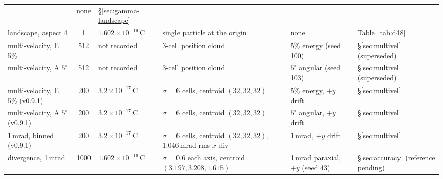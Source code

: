 \begin{table}[t]
\begin{longtable}{@{}p{2.3cm}cp{2.5cm}p{2.9cm}p{2.9cm}p{2.9cm}@{}}
  & none
  & \S\ref{sec:gamma-landscape} \\
landscape, aspect 4 & 1 & $1.602\times10^{-19}$\,C
  & single particle at the origin
  & none
  & Table~\ref{tab:d48} \\
 multi-velocity, E 5\% & 512 & not recorded
   & 3-cell position cloud
   & 5\% energy (seed 100)
   & \S\ref{sec:multivel} (superseded) \\
 multi-velocity, A $5^\circ$ & 512 & not recorded
   & 3-cell position cloud
   & $5^\circ$ angular (seed 103)
   & \S\ref{sec:multivel} (superseded) \\
 multi-velocity, E 5\% (v0.9.1) & 200 & $3.2\times10^{-17}$\,C
   & $\sigma\!=\!6$ cells, centroid $(32,32,32)$
   & 5\% energy, $+y$ drift
   & \S\ref{sec:multivel} \\
 multi-velocity, A $5^\circ$ (v0.9.1) & 200 & $3.2\times10^{-17}$\,C
   & $\sigma\!=\!6$ cells, centroid $(32,32,32)$
   & $5^\circ$ angular, $+y$ drift
   & \S\ref{sec:multivel} \\
 1\,mrad, binned (v0.9.1) & 200 & $3.2\times10^{-17}$\,C
   & $\sigma\!=\!6$ cells, centroid $(32,32,32)$, 1.046\,mrad rms $x$-div
   & 1\,mrad, $+y$ drift
   & \S\ref{sec:multivel} \\
 divergence, 1\,mrad & 1000 & $1.602\times10^{-16}$\,C
   & $\sigma\!=\!0.6$ each axis, centroid $(3.197,3.208,1.615)$
   & 1\,mrad paraxial, $+y$ (seed 43)
   & \S\ref{sec:accuracy} (reference pending) \\
\end{longtable}


\end{table}
